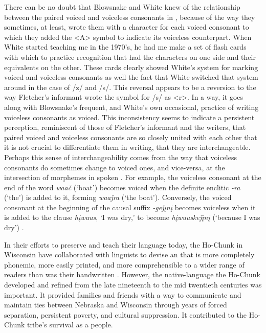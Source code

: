 \documentclass[output=paper]{LSP/langsci}
\begin{document}
There can be no doubt that Blowsnake and White knew of the relationship between the paired voiced and voiceless consonants in , because of the way they sometimes, at least, wrote them with a character for each voiced consonant to which they added the <A> symbol to indicate its voiceless counterpart. When White started teaching me  in the 1970's, he had me make a set of flash cards with which to practice recognition that had the  characters on one side and their  equivalents on the other. These cards clearly showed White's  system for marking voiced and voiceless consonants as well the fact that White switched that system around in the case of /z/ and /s/. This reversal appears to be a reversion to the way Fletcher's informant wrote the symbol for /s/ as <r>. In a way, it goes along with Blowsnake's frequent, and White's own occasional, practice of writing voiceless consonants as voiced. This inconsistency seems to indicate a persistent perception, reminiscent of those of Fletcher's informant and the   writers, that paired voiced and voiceless consonants are so closely united with each other that it is not crucial to differentiate them in writing, that they are interchangeable. Perhaps this sense of interchangeability comes from the way that voiceless consonants do sometimes change to voiced ones, and vice-versa, at the intersection of morphemes in spoken . For example, the voiceless consonant at the end of the word \emph{waa\v{c}} (`boat') becomes voiced when the definite enclitic \emph{-ra} (`the') is added to it, forming \emph{waa\v{j}ra} (`the boat'). Conversely, the voiced consonant at the beginning of the causal suffix \emph{-ge\v{j}\k{i}n\k{i}} becomes voiceless when it is added to the clause \emph{h\k{i}wuus}, `I was dry,' to become \emph{h\k{i}wuuske\v{j}\k{i}n\k{i}} (`because I was dry') \citep[33 \& 41]{Lipkind1945}. 

In their efforts to preserve and teach their language today, the Ho-Chunk in Wisconsin have collaborated with linguists to devise an  that is more completely phonemic, more easily printed, and more comprehensible to a wider range of readers than was their handwritten . However, the native-language  the Ho-Chunk developed and refined from the late nineteenth to the mid twentieth centuries was important. It provided families and friends with a way to communicate and maintain ties between Nebraska and Wisconsin through years of forced separation, persistent poverty, and cultural suppression. It contributed to the Ho-Chunk tribe's survival as a people. 

\printbibliography[heading=subbibliography,notkeyword=this]
\end{document}
